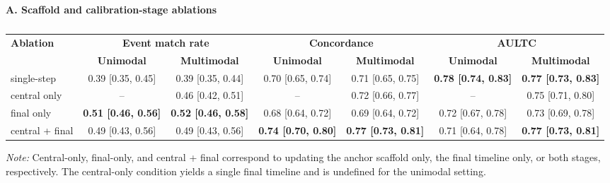 \begin{table}[htbp]
\caption{}
\ChEightTableBodyStart
\begin{ChEightFloatBody}
 
\setlength{\tabcolsep}{3pt} \renewcommand{\arraystretch}{1.08} 
 
\begin{minipage}{\textwidth} 
\scriptsize 
\noindent\textbf{A. Scaffold and calibration-stage ablations}\par

\begin{adjustbox}{max width=\linewidth}
\begin{tabular}{@{\extracolsep{\fill}}lcccccc@{}} 
\hline 
\multirow{2}{*}{\textbf{Ablation}} 
& \multicolumn{2}{c}{\textbf{Event match rate}} 
& \multicolumn{2}{c}{\textbf{Concordance}} 
& \multicolumn{2}{c}{\textbf{AULTC}} \\ 
\cline{2-7} 
& \textbf{Unimodal} 
& \textbf{Multimodal} 
& \textbf{Unimodal} 
& \textbf{Multimodal} 
& \textbf{Unimodal} 
& \textbf{Multimodal} \\ 
\hline 
single-step 
& 0.39 [0.35, 0.45] 
& 0.39 [0.35, 0.44] 
& 0.70 [0.65, 0.74] 
& 0.71 [0.65, 0.75] 
& \textbf{0.78 [0.74, 0.83]} 
& \textbf{0.77 [0.73, 0.83]} \\ 
central only 
& -- 
& 0.46 [0.42, 0.51] 
& -- 
& 0.72 [0.66, 0.77] 
& -- 
& 0.75 [0.71, 0.80] \\ 
final only 
& \textbf{0.51 [0.46, 0.56]} 
& \textbf{0.52 [0.46, 0.58]} 
& 0.68 [0.64, 0.72] 
& 0.69 [0.64, 0.72] 
& 0.72 [0.67, 0.78] 
& 0.73 [0.69, 0.78] \\ 
central + final 
& 0.49 [0.43, 0.56]
& 0.49 [0.43, 0.56]
& \textbf{0.74 [0.70, 0.80]}
& \textbf{0.77 [0.73, 0.81]}
& 0.71 [0.64, 0.78] 
& \textbf{0.77 [0.73, 0.81]} \\
\hline 
\end{tabular}
\end{adjustbox}


\noindent\textit{Note:} Central-only, final-only, and central + final correspond to updating the anchor scaffold only, the final timeline only, or both stages, respectively. The central-only condition yields a single final timeline and is undefined for the unimodal setting.



\end{minipage}
\end{ChEightFloatBody}
\end{table}
